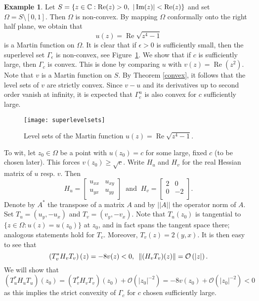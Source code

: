 \documentclass[11pt]{amsart}
\renewcommand{\Re}{\operatorname{Re}}
\renewcommand{\Im}{\operatorname{Im}}
\theoremstyle{definition}
\newtheorem{example}[thm]{Example}
\theoremstyle{remark}
\begin{document}
\begin{example}
Let $S= \{z\in\mathbb{C}: \Re(z)>0, \hspace{0.05in} |\Im(z)|< \Re(z)\}$ and set $\Omega = S\setminus[0, 1].$ Then $\Omega$ is non-convex. By mapping $\Omega$ conformally onto the right half plane, we obtain that
$$u(z) = \Re\sqrt{z^4 - 1}$$
is a Martin function on $\Omega$. It is clear that if $\epsilon >0$ is sufficiently small, then the superlevel set $\Gamma_{\epsilon}$ is non-convex, see Figure~\ref{fig:levelsets}. We show that if $c$ is sufficiently large,  then $\Gamma_{c}$ is convex. This is done by comparing $u$ with $v(z) = \Re(z^2)$. Note that $v$ is a Martin function on $S$. By Theorem \ref{convex}, it follows that the level sets of $v$ are strictly convex. Since $v-u$ and its derivatives up to second order vanish at infinity, it is expected that $\Gamma_c^u$ is also convex for $c$ sufficiently large. 

\begin{figure}[h!t]
\begin{center}
\texttt{[image: superlevelsets]}
\end{center}
\caption{Level sets of the Martin function $u(z) = \Re \sqrt{z^4-1}$.\label{fig:levelsets}}
\end{figure}

\vspace{0.1in}

\noindent To wit, let $z_0\in\Omega$ be a point with $u(z_0) = c$ for some large, fixed $c$ (to be chosen later). This forces  $v(z_0)\geq\sqrt{c}.$ Write $H_u$ and $H_v$ for the real Hessian matrix of $u$ resp. $v$. Then $$H_u=
\begin{bmatrix}
u_{xx} & u_{xy}\\
u_{yx}& u_{yy}\\
\end{bmatrix}
  \;\;\text{and}\;\; H_v=
\begin{bmatrix}
2 & 0\\
0&-2\\
\end{bmatrix}.
$$
 Denote by $A^{*}$ the transpose of a matrix $A$ and by $||A||$ the operator norm of $A.$ Set $T_u=(u_y,-u_x)$ and $T_v=(v_y,-v_x)$. Note that $T_u(z_0)$ is tangential to $\{z\in\Omega: u(z)=u(z_0)\}$ at $z_0$, and in fact spans the tangent space there; analogous statements hold for $T_v$. Moreover,  $T_v(z) = 2(y,x)$. It is then easy to see that 
%
\begin{equation}\label{hessv}
\left(T_v^{*}H_vT_v\right) (z) = -8v(z) < 0, \hspace{0.07in} 
\left\|(H_vT_v)(z)\right\|= \mathcal{O}\left(|z|\right).
\end{equation}
%
We will show that
%
\begin{equation}\label{hessu}
\left(T_u^{*}H_u T_u\right) (z_0) = \left(T_v^{*}H_v T_v\right) (z_0) + \mathcal{O}\left(|z_0|^{-2}\right) = -8v(z_0) + \mathcal{O}\left(|z_0|^{-2}\right) < 0
\end{equation}
as this implies the strict convexity of $\Gamma_{c}$ for $c$ chosen sufficiently large.


\end{example}
\end{document}
